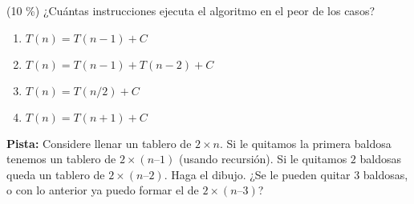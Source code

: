 \documentclass[twocolumn]{article}
\begin{document}
(10 \%) ¿Cuántas instrucciones ejecuta el algoritmo en el peor de los casos? \\

\begin{enumerate}[label=\Alph*.]
\item $T(n) = T(n-1) + C$
\item $T(n) = T(n-1)+T(n-2) + C$
\item $T(n) = T(n/2) + C$
\item $T(n) = T(n+1) + C$\\
\end{enumerate}

\textbf{Pista:} Considere llenar un tablero de $2 \times n$. Si le quitamos la primera baldosa tenemos un tablero de $2 \times (n – 1)$ (usando recursión). Si le quitamos $2$ baldosas queda un tablero de $2 \times (n – 2)$. Haga el dibujo. ¿Se le pueden quitar 3 baldosas, o con lo anterior ya puedo formar el de $2 \times (n – 3)$? \\
\end{document}
